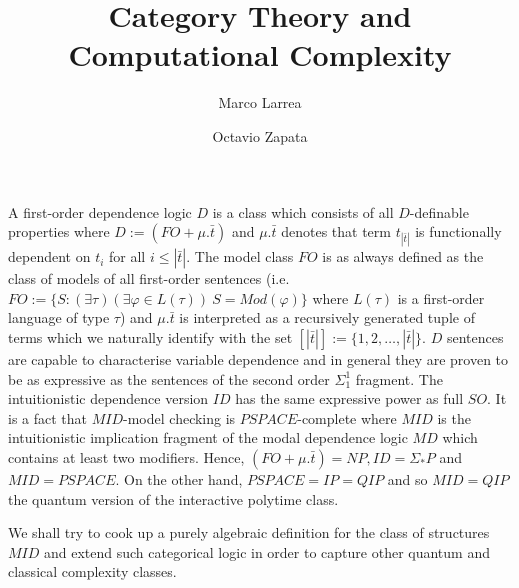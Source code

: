 

\title{Category Theory and \\ Computational Complexity}
\author{Marco Larrea \and Octavio Zapata}


\maketitle
A first-order dependence logic $D$ is a class which consists of all $D$-definable properties where $D := (FO + \mu.\bar{t})$ and $\mu.\bar{t}$ denotes that term $t_{|\bar{t}|}$ is functionally dependent on $t_{i}$ for all $i\leq |\bar{t}|$. The model class $FO$ is as always defined as the class of models of all first-order sentences (i.e. $FO:= \{S:(\exists\tau)(\exists\varphi\in L(\tau))\ S=Mod(\varphi)\}$ where $L(\tau)$ is a first-order language of type $\tau$) and $\mu.\bar{t}$ is interpreted as a recursively generated tuple of terms which we naturally identify with the set $[|\bar{t}|] := \{1,2,\dots,|\bar{t}|\}$. $D$ sentences are capable to characterise variable dependence and in general they are proven to be as expressive as the sentences of the second order $\Sigma_1^1$ fragment. The intuitionistic dependence version $ID$ has the same expressive power as full $SO$. It is a fact that $MID$-model checking is $PSPACE$-complete where $MID$ is the intuitionistic implication fragment of the modal dependence logic $MD$ which contains at least two modifiers. Hence, $(FO + \mu.\bar{t}) = NP, ID = \Sigma_{\ast}P$ and $MID = PSPACE$.  On the other hand, $PSPACE = IP = QIP$ and so $MID = QIP$ the quantum version of the interactive polytime class.

We shall try to cook up a purely algebraic definition for the class of structures $MID$ and extend such categorical logic in order to capture other quantum and classical complexity classes. 

\nocite{*}




